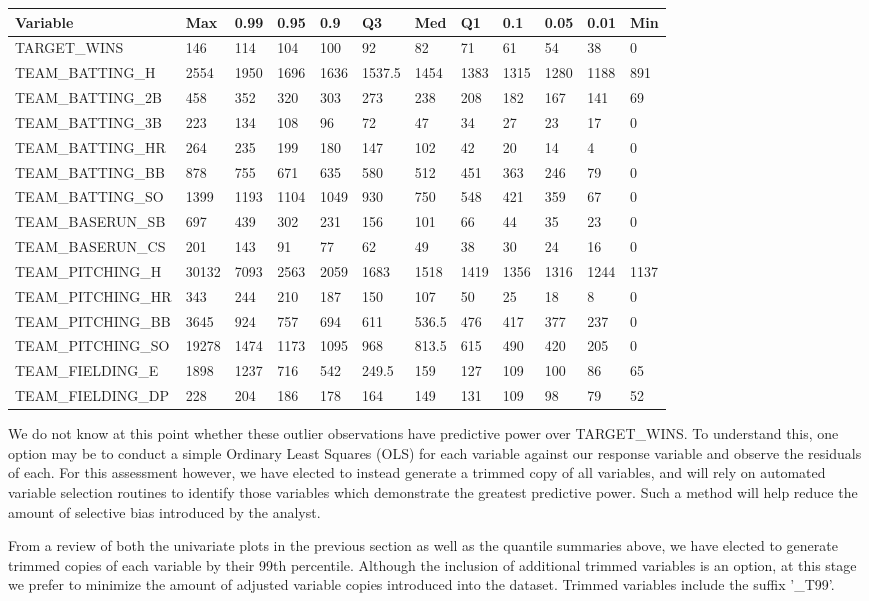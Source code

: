 \documentclass[]{article}
\begin{document}
\begin{longtable}[]{@{}llllllllllll@{}}
\toprule
Variable & Max & 0.99 & 0.95 & 0.9 & Q3 & Med & Q1 & 0.1 & 0.05 & 0.01 &
Min\tabularnewline
\midrule
\endhead
TARGET\_WINS & 146 & 114 & 104 & 100 & 92 & 82 & 71 & 61 & 54 & 38 &
0\tabularnewline
TEAM\_BATTING\_H & 2554 & 1950 & 1696 & 1636 & 1537.5 & 1454 & 1383 &
1315 & 1280 & 1188 & 891\tabularnewline
TEAM\_BATTING\_2B & 458 & 352 & 320 & 303 & 273 & 238 & 208 & 182 & 167
& 141 & 69\tabularnewline
TEAM\_BATTING\_3B & 223 & 134 & 108 & 96 & 72 & 47 & 34 & 27 & 23 & 17 &
0\tabularnewline
TEAM\_BATTING\_HR & 264 & 235 & 199 & 180 & 147 & 102 & 42 & 20 & 14 & 4
& 0\tabularnewline
TEAM\_BATTING\_BB & 878 & 755 & 671 & 635 & 580 & 512 & 451 & 363 & 246
& 79 & 0\tabularnewline
TEAM\_BATTING\_SO & 1399 & 1193 & 1104 & 1049 & 930 & 750 & 548 & 421 &
359 & 67 & 0\tabularnewline
TEAM\_BASERUN\_SB & 697 & 439 & 302 & 231 & 156 & 101 & 66 & 44 & 35 &
23 & 0\tabularnewline
TEAM\_BASERUN\_CS & 201 & 143 & 91 & 77 & 62 & 49 & 38 & 30 & 24 & 16 &
0\tabularnewline
TEAM\_PITCHING\_H & 30132 & 7093 & 2563 & 2059 & 1683 & 1518 & 1419 &
1356 & 1316 & 1244 & 1137\tabularnewline
TEAM\_PITCHING\_HR & 343 & 244 & 210 & 187 & 150 & 107 & 50 & 25 & 18 &
8 & 0\tabularnewline
TEAM\_PITCHING\_BB & 3645 & 924 & 757 & 694 & 611 & 536.5 & 476 & 417 &
377 & 237 & 0\tabularnewline
TEAM\_PITCHING\_SO & 19278 & 1474 & 1173 & 1095 & 968 & 813.5 & 615 &
490 & 420 & 205 & 0\tabularnewline
TEAM\_FIELDING\_E & 1898 & 1237 & 716 & 542 & 249.5 & 159 & 127 & 109 &
100 & 86 & 65\tabularnewline
TEAM\_FIELDING\_DP & 228 & 204 & 186 & 178 & 164 & 149 & 131 & 109 & 98
& 79 & 52\tabularnewline
\bottomrule
\end{longtable}

We do not know at this point whether these outlier observations have
predictive power over TARGET\_WINS. To understand this, one option may
be to conduct a simple Ordinary Least Squares (OLS) for each variable
against our response variable and observe the residuals of each. For
this assessment however, we have elected to instead generate a trimmed
copy of all variables, and will rely on automated variable selection
routines to identify those variables which demonstrate the greatest
predictive power. Such a method will help reduce the amount of selective
bias introduced by the analyst.

From a review of both the univariate plots in the previous section as
well as the quantile summaries above, we have elected to generate
trimmed copies of each variable by their 99th percentile. Although the
inclusion of additional trimmed variables is an option, at this stage we
prefer to minimize the amount of adjusted variable copies introduced
into the dataset. Trimmed variables include the suffix '\_T99'.
\end{document}
